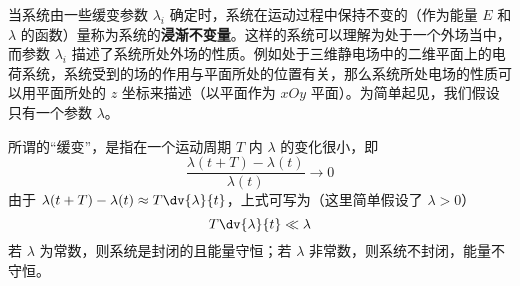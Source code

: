 
\begin{issues}
\issueTODO
\end{issues}

当系统由一些缓变参数 $\lambda_i$ 确定时，系统在运动过程中保持不变的（作为能量 $E$ 和 $\lambda$ 的函数）量称为系统的\textbf{浸渐不变量}。这样的系统可以理解为处于一个外场当中，而参数 $\lambda_i$ 描述了系统所处外场的性质。例如处于三维静电场中的二维平面上的电荷系统，系统受到的场的作用与平面所处的位置有关，那么系统所处电场的性质可以用平面所处的 $z$ 坐标来描述（以平面作为 $xOy$ 平面）。为简单起见，我们假设只有一个参数 $\lambda$。

所谓的“缓变”，是指在一个运动周期 $T$ 内 $\lambda$ 的变化很小，即 
\begin{equation}\label{ConAdi_eq4}
\frac{\lambda(t+T)-\lambda(t)}{\lambda(t)}\rightarrow0
\end{equation}
由于 $\lambda(t+T)-\lambda(t)\approx T\dv{\lambda}{t}$，上式可写为（这里简单假设了 $\lambda>0$）
\begin{equation}
T\dv{\lambda}{t}\ll\lambda
\end{equation}
若 $\lambda$ 为常数，则系统是封闭的且能量守恒；若 $\lambda$ 非常数，则系统不封闭，能量不守恒。
